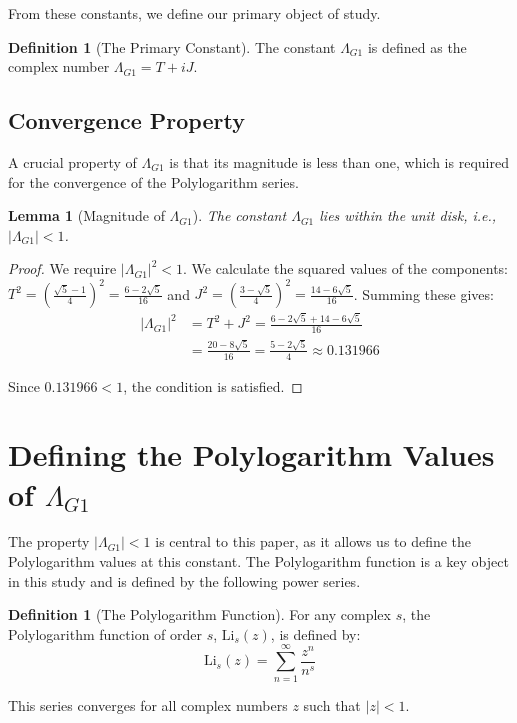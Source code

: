 \documentclass{amsart}
\theoremstyle{plain}
\newtheorem{lemma}[theorem]{Lemma}
\theoremstyle{definition}
\newtheorem{definition}[theorem]{Definition}
\theoremstyle{remark}
\newcommand{\LambdaG}{\Lambda_{G1}}
\begin{document}
From these constants, we define our primary object of study.
\begin{definition}[The Primary Constant]
The constant $\LambdaG$ is defined as the complex number $\LambdaG = T+iJ$.
\end{definition}

\subsection{Convergence Property}
A crucial property of $\LambdaG$ is that its magnitude is less than one, which is required for the convergence of the Polylogarithm series.

\begin{lemma}[Magnitude of $\LambdaG$]
\label{lem:convergence}
The constant $\LambdaG$ lies within the unit disk, i.e., $|\LambdaG| < 1$.
\end{lemma}
\begin{proof}
We require $|\LambdaG|^2 < 1$. We calculate the squared values of the components:
$T^2 = \left(\frac{\sqrt{5}-1}{4}\right)^2 = \frac{6-2\sqrt{5}}{16}$ and $J^2 = \left(\frac{3-\sqrt{5}}{4}\right)^2 = \frac{14-6\sqrt{5}}{16}$.
Summing these gives:
\begin{align*}
    |\LambdaG|^2 &= T^2+J^2 = \frac{6-2\sqrt{5} + 14-6\sqrt{5}}{16} \\
                 &= \frac{20-8\sqrt{5}}{16} = \frac{5-2\sqrt{5}}{4} \approx 0.131966
\end{align*}

Since $0.131966 < 1$, the condition is satisfied.
\end{proof}

\section{Defining the Polylogarithm Values of \texorpdfstring{$\LambdaG$}{Lambda\_G1}}
The property $|\LambdaG| < 1$ is central to this paper, as it allows us to define the Polylogarithm values at this constant. The Polylogarithm function is a key object in this study and is defined by the following power series.

\begin{definition}[The Polylogarithm Function]
For any complex $s$, the Polylogarithm function of order $s$, $\mathrm{Li}_s(z)$, is defined by:
$$ \mathrm{Li}_s(z) = \sum_{n=1}^{\infty} \frac{z^n}{n^s} $$

This series converges for all complex numbers $z$ such that $|z|<1$.
\end{definition}
\end{document}
